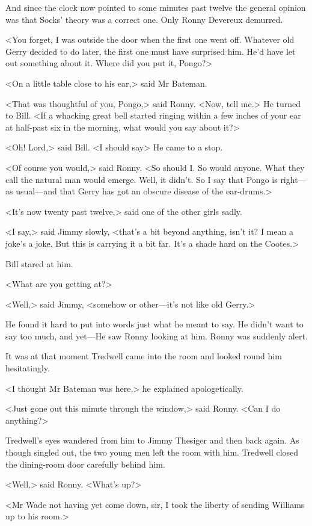 And since the clock now pointed to some minutes past twelve the general opinion was that Socks' theory was a correct one. Only Ronny Devereux demurred.

<You forget, I was outside the door when the first one went off. Whatever old Gerry decided to do later, the first one must have surprised him. He'd have let out something about it. Where did you put it, Pongo?>

<On a little table close to his ear,> said Mr Bateman.

<That was thoughtful of you, Pongo,> said Ronny. <Now, tell me.> He turned to Bill. <If a whacking great bell started ringing within a few inches of your ear at half-past six in the morning, what would you say about it?>

<Oh! Lord,> said Bill. <I should say\longdash> He came to a stop.

<Of course you would,> said Ronny. <So should I. So would anyone. What they call the natural man would emerge. Well, it didn't. So I say that Pongo is right—as usual—and that Gerry has got an obscure disease of the ear-drums.>

<It's now twenty past twelve,> said one of the other girls sadly.

<I say,> said Jimmy slowly, <that's a bit beyond anything, isn't it? I mean a joke's a joke. But this is carrying it a bit far. It's a shade hard on the Cootes.>

Bill stared at him.

<What are you getting at?>

<Well,> said Jimmy, <somehow or other—it's not like old Gerry.>

He found it hard to put into words just what he meant to say. He didn't want to say too much, and yet—He saw Ronny looking at him. Ronny was suddenly alert.

It was at that moment Tredwell came into the room and looked round him hesitatingly.

<I thought Mr Bateman was here,> he explained apologetically.

<Just gone out this minute through the window,> said Ronny. <Can I do anything?>

Tredwell's eyes wandered from him to Jimmy Thesiger and then back again. As though singled out, the two young men left the room with him. Tredwell closed the dining-room door carefully behind him.

<Well,> said Ronny. <What's up?>

<Mr Wade not having yet come down, sir, I took the liberty of sending Williams up to his room.>

